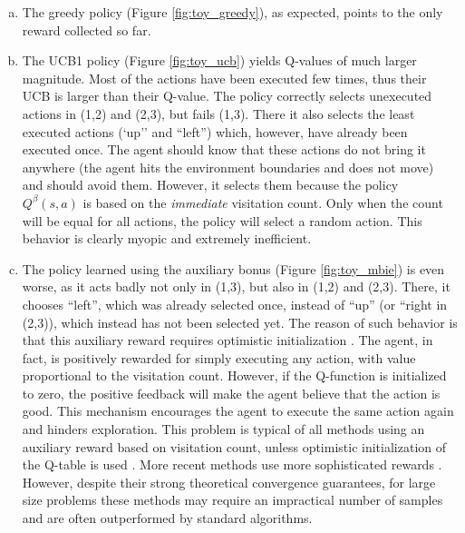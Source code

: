 \documentclass{article}
\begin{document}
\begin{enumerate}[a)]
\setlength{\itemsep}{0pt}
\item The greedy policy (Figure \ref{fig:toy_greedy}), as expected, points to the only reward collected so far.
\item The UCB1 policy (Figure \ref{fig:toy_ucb}) yields Q-values of much larger magnitude. Most of the actions have been executed few times, thus their UCB is larger than their Q-value. The policy correctly selects unexecuted actions in (1,2) and (2,3), but fails (1,3). There it also selects the least executed actions (`up'' and ``left'') which, however, have already been executed once. The agent should know that these actions do not bring it anywhere (the agent hits the environment boundaries and does not move) and should avoid them. However, it selects them because the policy $Q^\beta(s,a)$ is based on the \textit{immediate} visitation count.
Only when the count will be equal for all actions, the policy will select a random action. This behavior is clearly myopic and extremely inefficient.
\item The policy learned using the auxiliary bonus (Figure \ref{fig:toy_mbie}) is even worse, as it acts badly not only in (1,3), but also in (1,2) and (2,3). There, it chooses ``left'', which was already selected once, instead of ``up'' (or ``right in (2,3)), which instead has not been selected yet.
The reason of such behavior is that this auxiliary reward requires optimistic initialization \citep{strehl2008analysis}. The agent, in fact, is positively rewarded for simply executing any action, with value proportional to the visitation count. However, if the Q-function is initialized to zero, the positive feedback will make the agent believe that the action is good. This mechanism encourages the agent to execute the same action again and hinders exploration.
This problem is typical of all methods using an auxiliary reward based on visitation count, unless optimistic initialization of the Q-table is used \citep{strehl2008analysis}. More recent methods use more sophisticated rewards \citep{jin2018iq,dong2019q}.
However, despite their strong theoretical convergence guarantees, for large size problems these methods may require an impractical number of samples and are often outperformed by standard algorithms. 
\end{enumerate}
\end{document}
